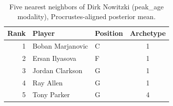 \begin{table}[htbp]
  \centering\small
  \begin{tabular}{rllc}
    \toprule
    Rank & Player & Position & Archetype \\
    \midrule
    1 & Boban Marjanovic & C & 1 \\
    2 & Ersan Ilyasova & F & 1 \\
    3 & Jordan Clarkson & G & 1 \\
    4 & Ray Allen & G & 1 \\
    5 & Tony Parker & G & 4 \\
    \bottomrule
  \end{tabular}
  \caption{Five nearest neighbors of Dirk Nowitzki (peak_age modality), Procrustes-aligned posterior mean.}
  \label{tab:Dirk_Nowitzki_neighbors_peak_age}
\end{table}

